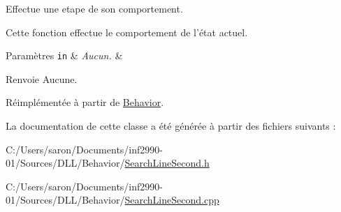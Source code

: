 Effectue une etape de son comportement. 

Cette fonction effectue le comportement de l'état actuel.


\begin{DoxyParams}[1]{Paramètres}
\mbox{\tt in}  & {\em Aucun.} & \\
\hline
\end{DoxyParams}
\begin{DoxyReturn}{Renvoie}
Aucune. 
\end{DoxyReturn}


Réimplémentée à partir de \hyperlink{group__inf2990_gac22f205bc85075ff707ad1f695c18439}{Behavior}.



La documentation de cette classe a été générée à partir des fichiers suivants \-:\begin{DoxyCompactItemize}
\item 
C\-:/\-Users/saron/\-Documents/inf2990-\/01/\-Sources/\-D\-L\-L/\-Behavior/\hyperlink{_search_line_second_8h}{Search\-Line\-Second.\-h}\item 
C\-:/\-Users/saron/\-Documents/inf2990-\/01/\-Sources/\-D\-L\-L/\-Behavior/\hyperlink{_search_line_second_8cpp}{Search\-Line\-Second.\-cpp}\end{DoxyCompactItemize}
